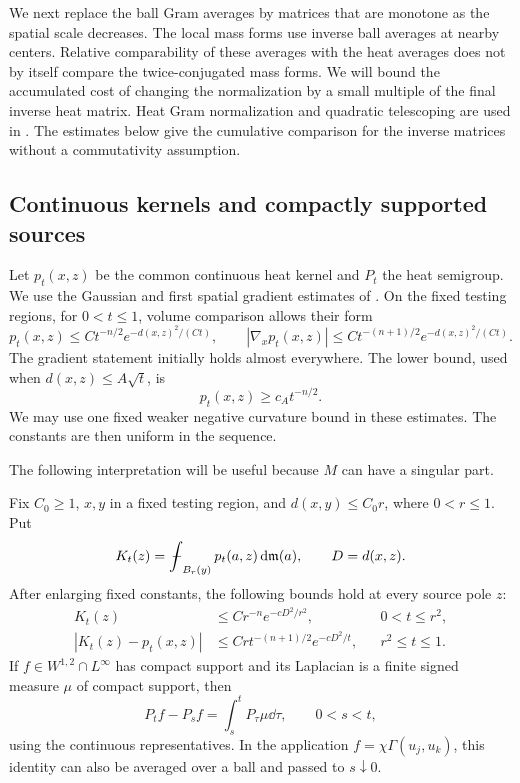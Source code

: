 We next replace the ball Gram averages by matrices that are
monotone as the spatial scale decreases.  The local mass forms use
inverse ball averages at nearby centers.  Relative comparability
of these averages with the heat averages does not by itself compare
the twice-conjugated mass forms.
We will bound the accumulated cost of changing the normalization by
a small multiple of the final inverse heat matrix.
Heat Gram normalization and quadratic telescoping are used in
\cite[Sections~8.1--8.2]{CJN21}. The estimates below give the cumulative
comparison for the inverse matrices without a commutativity
assumption.

\subsection{Continuous kernels and compactly supported sources}

Let \(p_t(x,z)\) be the common continuous heat kernel and \(P_t\)
the heat semigroup.  We use the Gaussian and first spatial
gradient estimates of \cite[Theorem~1.2 and Corollary~1.2]{JLZ16}.
On the fixed testing regions, for \(0<t\le1\), volume comparison
allows their form
\begin{equation}\label{co:kernel-bounds}
 p_t(x,z)\le C t^{-n/2}e^{-d(x,z)^2/(Ct)},
 \qquad
 |\nabla_xp_t(x,z)|\le C t^{-(n+1)/2}e^{-d(x,z)^2/(Ct)}.
\end{equation}
The gradient statement initially holds almost everywhere.  The
lower bound, used when \(d(x,z)\le A\sqrt t\), is
\begin{equation}\label{co:kernel-lower}
 p_t(x,z)\ge c_A t^{-n/2}.
\end{equation}
We may use one fixed weaker negative curvature bound in these
estimates.  The constants are then uniform in the sequence.

The following interpretation will be useful because \(M\) can
have a singular part.

\begin{lemma}\label{co:kernel-measures}
Fix \(C_0\ge1\), \(x,y\) in a fixed testing region, and
\(d(x,y)\le C_0r\), where \(0<r\le1\).  Put
\[
 K_t(z)=\fint_{B_r(y)}p_t(a,z)\dd\m(a),
 \qquad D=d(x,z).
\]
After enlarging fixed constants, the following bounds hold at
every source pole \(z\):
\begin{align}
 K_t(z)&\le C r^{-n}e^{-cD^2/r^2},&&0<t\le r^2,
       \label{co:short-kernel}\\
 |K_t(z)-p_t(x,z)|&\le C r t^{-(n+1)/2}e^{-cD^2/t},
       &&r^2\le t\le1.\label{co:long-kernel}
\end{align}
If \(f\in W^{1,2}\cap L^\infty\) has compact support and its
Laplacian is a finite signed measure \(\mu\) of compact support,
then
\begin{equation}\label{co:semigroup-measure}
 P_t f-P_s f=\int_s^t P_\tau\mu\dd\tau,
 \qquad 0<s<t,
\end{equation}
using the continuous representatives.  In the application
\(f=\chi\Gamma(u_j,u_k)\), this identity can also be averaged over
a ball and passed to \(s\downarrow0\).
\end{lemma}

